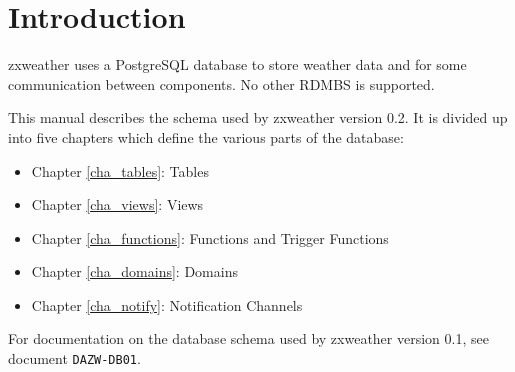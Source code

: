 \documentclass[a4paper,10pt]{book}
\newcommand{\partnumber}{\ifthenelse{\isundefined{\projectnum}}{}{\projectnum-\docnum	\ifthenelse{\equal{\docrev}{001}}{}{.\docrev}}}
\begin{document}

\ifthenelse{\isundefined{\ordernumber}}{

\title{\doctitle{} - \docsubtitle}
\author{\docauthor}
}{

\title{\doctitle}
\subtitle{\docsubtitle}
\titleabstract{\docabstract}
\ordernumber{\partnumber}
\updateinfo{\docupdateinfo}
\osinfo{\docosver}
\swversion{\docswver}
\titlecopyright{\doccopyright}
\licensestatement{\doclicense}
}
\date{\docdate}

\maketitle

\clearpage

\tableofcontents
\clearpage


\chapter{Introduction}
\setcounter{page}{1}

zxweather uses a PostgreSQL database to store weather data and for some communication between components. No other RDMBS is supported.

This manual describes the schema used by zxweather version 0.2. It is divided up into five chapters which define the various parts of the database:
\begin{itemize}
\item Chapter \ref{cha_tables}: Tables
\item Chapter \ref{cha_views}: Views
\item Chapter \ref{cha_functions}: Functions and Trigger Functions
\item Chapter \ref{cha_domains}: Domains
\item Chapter \ref{cha_notify}: Notification Channels
\end{itemize}

For documentation on the database schema used by zxweather version 0.1, see document \verb|DAZW-DB01|.
\end{document}
